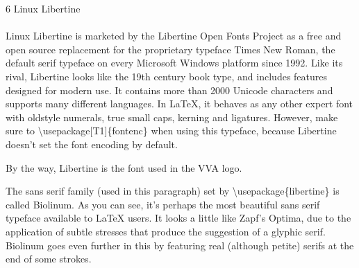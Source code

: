 \documentclass{article}
\begin{document}
\frenchspacing
\noindent
{\LARGE 6 Linux Libertine}\\
~\\
Linux Libertine is marketed by the Libertine Open Fonts Project as
a free and open source replacement for the proprietary typeface Times New
Roman, the default serif typeface on every Microsoft Windows platform since
1992. Like its rival, Libertine looks like the 19th century
book type, and includes features designed for modern use. It contains more
than 2000 Unicode characters and supports many different
languages. In \LaTeX, it behaves as any other expert font with oldstyle
numerals, true small caps, kerning and ligatures.
However, make sure to \textbackslash usepackage[T1]\{fontenc\} when using
this typeface, because Libertine doesn't set the font encoding by default.

By the way, Libertine is the font used in the
{\fontsize{11.3}{0}\selectfont V\hspace{-4.6pt}V}A
logo.

\sf The sans serif family (used in this paragraph) set by
\textbackslash usepackage\{libertine\} is called Biolinum. As you can
see, it's perhaps the most beautiful sans serif typeface available to
\LaTeX{} users. It looks a little like Zapf's Optima, due to
the application of subtle stresses that produce the suggestion of a
glyphic serif. Bio\-linum goes even further in this by featuring real
(although petite) serifs at the end of some strokes.
\end{document}

